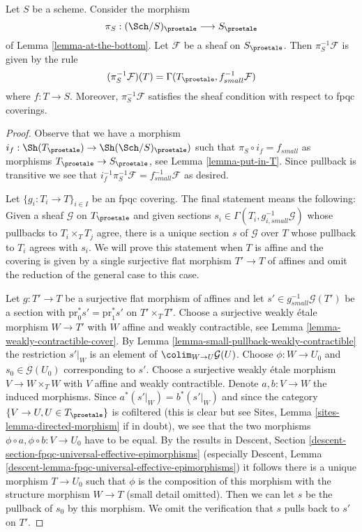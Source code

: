 \begin{lemma}
\label{lemma-describe-pullback}
Let $S$ be a scheme. Consider the morphism
$$
\pi_S : (\Sch/S)_\proetale \longrightarrow S_\proetale
$$
of Lemma \ref{lemma-at-the-bottom}. Let $\mathcal{F}$ be a sheaf on
$S_\proetale$. Then $\pi_S^{-1}\mathcal{F}$ is given by the rule
$$
(\pi_S^{-1}\mathcal{F})(T) = \Gamma(T_\proetale, f_{small}^{-1}\mathcal{F})
$$
where $f : T \to S$. Moreover, $\pi_S^{-1}\mathcal{F}$ satisfies the
sheaf condition with respect to fpqc coverings.
\end{lemma}

\begin{proof}
Observe that we have a morphism
$i_f : \Sh(T_\proetale) \to \Sh(\Sch/S)_\proetale)$
such that $\pi_S \circ i_f = f_{small}$ as morphisms
$T_\proetale \to S_\proetale$, see Lemma \ref{lemma-put-in-T}.
Since pullback is transitive we see that
$i_f^{-1} \pi_S^{-1}\mathcal{F} = f_{small}^{-1}\mathcal{F}$ as desired.

\medskip\noindent
Let $\{g_i : T_i \to T\}_{i \in I}$ be an fpqc covering. The final statement
means the following: Given a sheaf $\mathcal{G}$ on $T_\proetale$ and given
sections $s_i \in \Gamma(T_i, g_{i, small}^{-1}\mathcal{G})$ whose pullbacks
to $T_i \times_T T_j$ agree, there is a unique section $s$ of $\mathcal{G}$
over $T$ whose pullback to $T_i$ agrees with $s_i$. We will prove this
statement when $T$ is affine and the covering is given by a single
surjective flat morphism $T' \to T$ of affines and omit the reduction of
the general case to this case.

\medskip\noindent
Let $g : T' \to T$ be a surjective flat morphism of affines and let
$s' \in g_{small}^{-1}\mathcal{G}(T')$ be a section with
$\text{pr}_0^*s' = \text{pr}_1^*s'$ on $T' \times_T T'$.
Choose a surjective weakly \'etale morphism $W \to T'$ with
$W$ affine and weakly contractible, see
Lemma \ref{lemma-weakly-contractible-cover}. By
Lemma \ref{lemma-small-pullback-weakly-contractible}
the restriction $s'|_W$ is an element of $\colim_{W \to U} \mathcal{G}(U)$.
Choose $\phi : W \to U_0$ and $s_0 \in \mathcal{G}(U_0)$ corresponding to $s'$.
Choose a surjective weakly \'etale morphism $V \to W \times_T W$
with $V$ affine and weakly contractible.
Denote $a, b : V \to W$ the induced morphisms.
Since $a^*(s'|_W) = b^*(s'|_W)$ and since the category
$\{V \to U, U \in T_\proetale\}$ is cofiltered
(this is clear but see
Sites, Lemma \ref{sites-lemma-directed-morphism} if in doubt),
we see that the two morphisms $\phi \circ a , \phi \circ b : V \to U_0$
have to be equal. By the results in
Descent, Section \ref{descent-section-fpqc-universal-effective-epimorphisms}
(especially
Descent, Lemma \ref{descent-lemma-fpqc-universal-effective-epimorphisms})
it follows there is a unique morphism $T \to U_0$ such that $\phi$
is the composition of this morphism with the structure morphism $W \to T$
(small detail omitted). Then we can let $s$ be the pullback
of $s_0$ by this morphism. We omit the verification that
$s$ pulls back to $s'$ on $T'$.
\end{proof}









